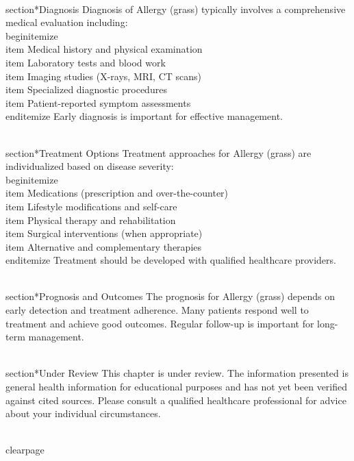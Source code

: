 \\section*{Diagnosis}
Diagnosis of Allergy (grass) typically involves a comprehensive medical evaluation including:
\\begin{itemize}
  \\item Medical history and physical examination
  \\item Laboratory tests and blood work
  \\item Imaging studies (X-rays, MRI, CT scans)
  \\item Specialized diagnostic procedures
  \\item Patient-reported symptom assessments
\\end{itemize}
Early diagnosis is important for effective management.

\\section*{Treatment Options}
Treatment approaches for Allergy (grass) are individualized based on disease severity:
\\begin{itemize}
  \\item Medications (prescription and over-the-counter)
  \\item Lifestyle modifications and self-care
  \\item Physical therapy and rehabilitation
  \\item Surgical interventions (when appropriate)
  \\item Alternative and complementary therapies
\\end{itemize}
Treatment should be developed with qualified healthcare providers.

\\section*{Prognosis and Outcomes}
The prognosis for Allergy (grass) depends on early detection and treatment adherence. Many patients respond well to treatment and achieve good outcomes. Regular follow-up is important for long-term management.

\\section*{Under Review}
This chapter is under review. The information presented is general health information for educational purposes and has not yet been verified against cited sources. Please consult a qualified healthcare professional for advice about your individual circumstances.

\\clearpage
